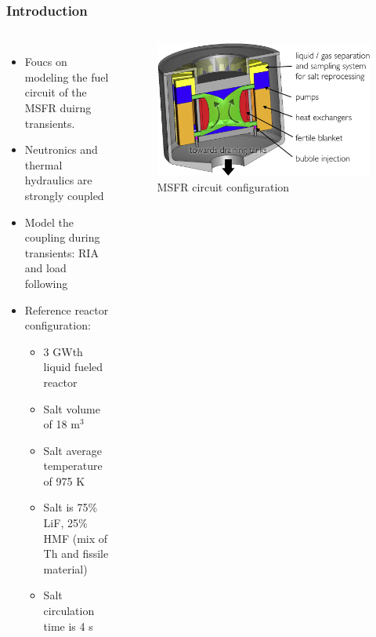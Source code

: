 \begin{frame}
  \frametitle{Introduction}
        \begin{columns}
                \column[t]{5cm}
                \begin{itemize}
                \item Foucs on modeling the fuel circuit of the \gls{MSFR} duirng transients. 

                \item Neutronics and thermal hydraulics are strongly coupled  

                \item Model the coupling during transients: RIA and load following  

                \item Reference reactor configuration:
                \begin{itemize}
                        \item 3 GWth liquid fueled reactor
                        \item Salt volume of 18 m$^3$
                        \item Salt average temperature of 975 K
                        \item Salt is 75\% LiF, 25\% HMF (mix of Th and fissile material)
                        \item Salt circulation time is 4 s
                \end{itemize}
                \end{itemize}
                
                \column[t]{5cm}
                \begin{figure}[htbp!]
                        \begin{center}
                        \includegraphics[scale=0.65]{JC-Oct16/reactor-loops.jpg}
                        \end{center}
                        \caption{\gls{MSFR} circuit configuration}
                        \label{fig:MSFR circuit}
                \end{figure}
        \end{columns}
\end{frame}


